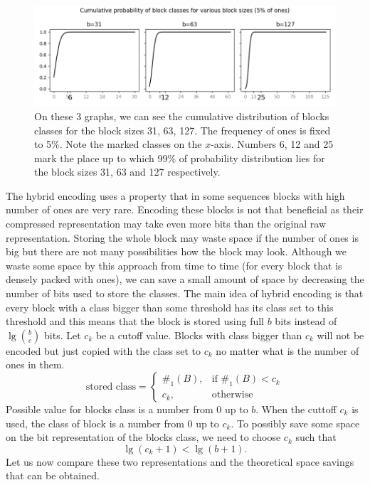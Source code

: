 \begin{figure}
	\centerline{
		\includegraphics[width=\textwidth]{images/hybrid_encoding_motivation}
	}
	\caption[TODO]{On these 3 graphs, we can see the cumulative distribution
    of blocks classes for the block sizes 31, 63, 127. The frequency of ones is
    fixed to 5\%. Note the marked classes on the $x$-axis. Numbers 6, 12 and
    25 mark the place up to which 99\% of probability distribution lies for
    the block sizes 31, 63 and 127 respectively.
	}
	\label{obr:hybridEncodingDistribution}
\end{figure}

The hybrid encoding uses a property that in some sequences blocks with high number
of ones are very rare. Encoding these blocks is not that beneficial as their
compressed representation may take even more bits than the original raw
representation. Storing the whole block may waste space if the number of
ones is big but there are not many possibilities how the block may look.
Although we waste some space by this approach from time to time (for every
block that is densely packed with ones), we can save a small amount of space
by decreasing the number of bits used to store the classes. The main idea
of hybrid encoding is that every block with a class bigger than some threshold
has its class set to this threshold and this means that the block
is stored using full $b$ bits instead of $\lg {b\choose c}$ bits.
Let $c_k$ be a cutoff value. Blocks with class bigger than $c_k$ will not be
encoded but just copied with the class set to $c_k$ no matter what is the
number of ones in them.
\[
    \text{stored class} = 
\begin{cases}
    \#_1(B),& \text{if } \#_1(B) < c_k\\
    c_k,              & \text{otherwise}
\end{cases}
\]
Possible value for blocks class is a number from 0 up to $b$. When the cuttoff $c_k$ is
used, the class of block is a number from 0 up to $c_k$. To possibly save some space on
the bit representation of the blocks class, we need to choose $c_k$ such that
$$\lg (c_k+1) < \lg (b+1).$$ Let us now compare these two representations
and the theoretical space savings that can be obtained.

